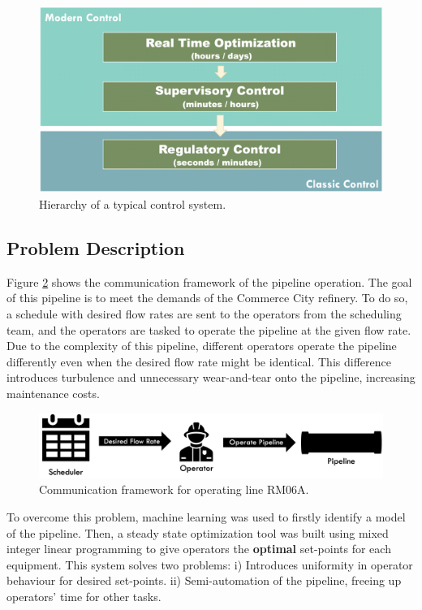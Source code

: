 \begin{figure}[h]
    \centering
    \includegraphics[scale=0.15]{images/08APC.png}
    \caption{Hierarchy of a typical control system.}
    \label{fig:08APC}
\end{figure}

\subsection{Problem Description}
Figure \ref{fig:08schedule} shows the communication framework of the pipeline operation. The goal of this pipeline is to meet the demands of the Commerce City refinery. To do so, a schedule with desired flow rates are sent to the operators from the scheduling team, and the operators are tasked to operate the pipeline at the given flow rate. Due to the complexity of this pipeline, different operators operate the pipeline differently even when the desired flow rate might be identical.  This difference introduces turbulence and unnecessary wear-and-tear onto the pipeline, increasing maintenance costs. 

\begin{figure}[h]
    \centering
    \includegraphics[scale=0.35]{images/08Schedule.png}
    \caption{Communication framework for operating line RM06A.}
    \label{fig:08schedule}
\end{figure}

To overcome this problem, machine learning was used to firstly identify a model of the pipeline.  Then, a steady state optimization tool was built using mixed integer linear programming to give operators the \textbf{optimal} set-points for each equipment.  This system solves two problems: i) Introduces uniformity in operator behaviour for desired set-points. ii) Semi-automation of the pipeline, freeing up operators' time for other tasks.

